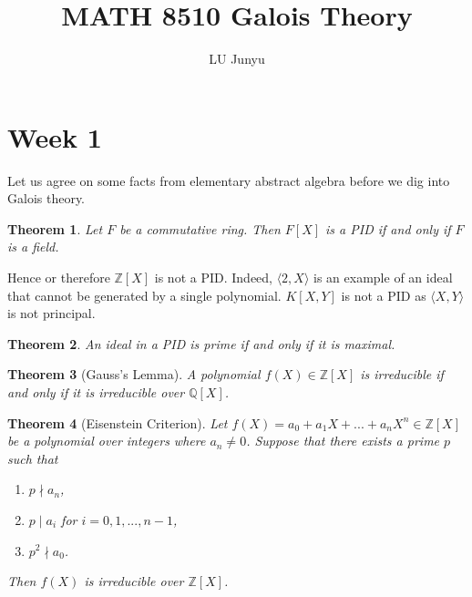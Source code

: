 \documentclass[12pt,reqno]{amsart}
\newtheorem{thm}{Theorem}[section]
\def\ZZ{\mathbb{Z}}
\def\QQ{\mathbb{Q}}
\begin{document}
\title{MATH 8510 Galois Theory}
\author{LU Junyu}


\maketitle

\section{Week 1}
\label{Week 1}

\noindent Let us agree on some facts from elementary abstract algebra before we dig into Galois theory.

\begin{thm}
Let $F$ be a commutative ring. Then $F[X]$ is a PID if and only if $F$ is a field.
\end{thm}

Hence or therefore $\ZZ[X]$ is not a PID. Indeed, $\langle 2, X\rangle$ is an example of an ideal that cannot be generated by a single polynomial. $K[X,Y]$ is not a PID as $\langle X, Y \rangle$ is not principal.

\begin{thm}
    An ideal in a PID is prime if and only if it is maximal.
\end{thm}

\begin{thm}[Gauss's Lemma]
    A polynomial $f(X)\in \ZZ[X]$ is irreducible if and only if it is irreducible over $\QQ[X]$.
\end{thm}

\begin{thm}[Eisenstein Criterion]
    Let $f(X) = a_0+a_1X+...+a_nX^n\in \ZZ[X]$ be a polynomial over integers where $a_n\not= 0$. Suppose that there exists a prime $p$ such that \begin{enumerate}
        \item      $p\nmid a_n$, 
        \item  $p\mid a_i$ for $i=0,1,...,n-1$,
        \item  $p^2\nmid a_0$.
    \end{enumerate}
    Then $f(X)$ is irreducible over $\ZZ[X]$.
\end{thm}



\newpage
\begin{thebibliography}{99} %



\end{thebibliography}
\end{document}
